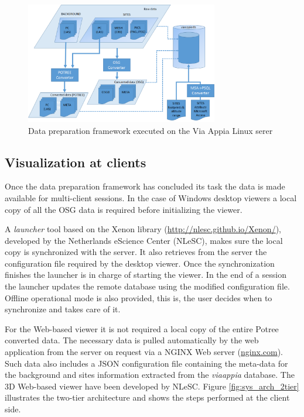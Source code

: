 \begin{figure}[H] \centering
\includegraphics[width=0.75\textwidth]{fig/system_architecture/DataFramework.pdf}
\caption{Data preparation framework executed on the Via Appia Linux serer}
\label{fig:sys_arch_data_framework} \end{figure}

\subsection{Visualization at clients}

Once the data preparation framework has concluded its task the data is made available
for multi-client sessions. In the case of Windows desktop viewers a local copy of all the OSG data is required before initializing the viewer.

A \textit{launcher} tool based on the Xenon library (\url{http://nlesc.github.io/Xenon/}),
developed by the Netherlands eScience Center (NLeSC), makes sure the local copy is
synchronized with the server. It also retrieves from the server the configuration
file required by the desktop viewer. Once the synchronization finishes the launcher
is in charge of starting the viewer. In the end of a session the launcher updates
the remote database using the modified configuration file. Offline operational
mode is also provided, this is, the user decides when to synchronize and takes care of it.

For the Web-based viewer it is not required a local copy of the entire Potree converted
data. The necessary data is pulled automatically by the web application from the server on request via a NGINX Web server
(\url{nginx.com}). Such data also includes a JSON configuration file containing the
meta-data for the background and sites information extracted from the {\em viaappia}
database. The 3D Web-based viewer have been developed by NLeSC. Figure \ref{fig:sys_arch_2tier}
illustrates the two-tier architecture and shows the steps performed at the client
side. 

